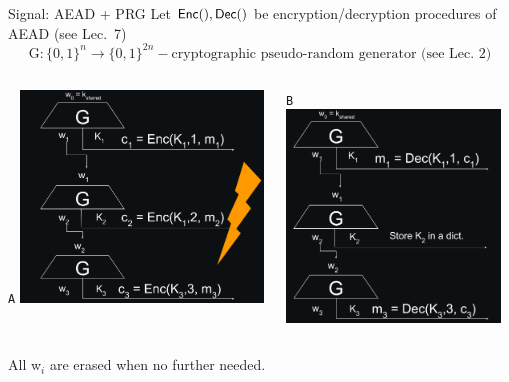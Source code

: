 \documentclass[usenames,dvipsnames, 9pt]{beamer}
\begin{document}
\begin{frame}{Signal: AEAD + PRG}
Let $\textsf{Enc}(),\textsf{Dec}()$ be encryption/decryption procedures of AEAD (see  Lec.\ 7)
\[
\text{G}: \{0,1\}^n \rightarrow \{0,1\}^{2n} - \text{cryptographic pseudo-random generator (see Lec. 2)}
\]
\vspace{10pt}
\begin{columns}
	\begin{column}{0.5\textwidth}
		\centering
		{\LARGE \color{Orange}\texttt{A}}
		\includegraphics[width=0.95\textwidth]{SendSignalNoC2}
	\end{column}
	\begin{column}{0.5\textwidth}
		\centering
		{\LARGE \color{Orange}\texttt{B}}
		\pause 
		\includegraphics[width=0.95\textwidth]{ReceiveSignalNoC2}
	\end{column}
\end{columns}
\centering
\vspace{10pt}
All w$_i$ are erased when no further needed.
\end{frame}
\end{document}
